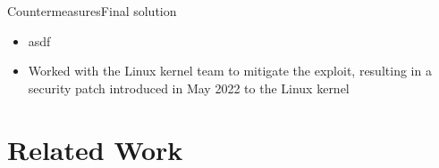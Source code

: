 \documentclass[aspectratio=169, hyperref={colorlinks=true, allcolors=SecondaryColor}, c]{beamer}
\begin{document}
\begin{frame}[fragile]{Countermeasures}{Final solution}
	\ifbeamer
		\begin{itemize}
			\item asdf
		\end{itemize}
	\else
		\begin{itemize}
			\item Worked with the Linux kernel team to mitigate the exploit, resulting in a security patch introduced in May 2022 to the Linux kernel
		\end{itemize}
	\fi
\end{frame}

\section{Related Work}
\end{document}

